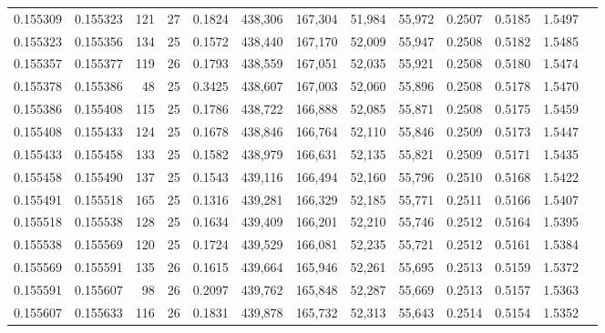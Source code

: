 \begin{tabular}{rrrrrrrrrrrrr}
0.155309 & 0.155323 & 121 &  27 &                                     0.1824 & 438,306 & 167,304 &  51,984 &  55,972 & 0.2507 & 0.5185 & 1.5497 \\
0.155323 & 0.155356 & 134 &  25 &                                     0.1572 & 438,440 & 167,170 &  52,009 &  55,947 & 0.2508 & 0.5182 & 1.5485 \\
0.155357 & 0.155377 & 119 &  26 &                                     0.1793 & 438,559 & 167,051 &  52,035 &  55,921 & 0.2508 & 0.5180 & 1.5474 \\
0.155378 & 0.155386 &  48 &  25 &                                     0.3425 & 438,607 & 167,003 &  52,060 &  55,896 & 0.2508 & 0.5178 & 1.5470 \\
0.155386 & 0.155408 & 115 &  25 &                                     0.1786 & 438,722 & 166,888 &  52,085 &  55,871 & 0.2508 & 0.5175 & 1.5459 \\
0.155408 & 0.155433 & 124 &  25 &                                     0.1678 & 438,846 & 166,764 &  52,110 &  55,846 & 0.2509 & 0.5173 & 1.5447 \\
0.155433 & 0.155458 & 133 &  25 &                                     0.1582 & 438,979 & 166,631 &  52,135 &  55,821 & 0.2509 & 0.5171 & 1.5435 \\
0.155458 & 0.155490 & 137 &  25 &                                     0.1543 & 439,116 & 166,494 &  52,160 &  55,796 & 0.2510 & 0.5168 & 1.5422 \\
0.155491 & 0.155518 & 165 &  25 &                                     0.1316 & 439,281 & 166,329 &  52,185 &  55,771 & 0.2511 & 0.5166 & 1.5407 \\
0.155518 & 0.155538 & 128 &  25 &                                     0.1634 & 439,409 & 166,201 &  52,210 &  55,746 & 0.2512 & 0.5164 & 1.5395 \\
0.155538 & 0.155569 & 120 &  25 &                                     0.1724 & 439,529 & 166,081 &  52,235 &  55,721 & 0.2512 & 0.5161 & 1.5384 \\
0.155569 & 0.155591 & 135 &  26 &                                     0.1615 & 439,664 & 165,946 &  52,261 &  55,695 & 0.2513 & 0.5159 & 1.5372 \\
0.155591 & 0.155607 &  98 &  26 &                                     0.2097 & 439,762 & 165,848 &  52,287 &  55,669 & 0.2513 & 0.5157 & 1.5363 \\
0.155607 & 0.155633 & 116 &  26 &                                     0.1831 & 439,878 & 165,732 &  52,313 &  55,643 & 0.2514 & 0.5154 & 1.5352 \\

\end{tabular}
